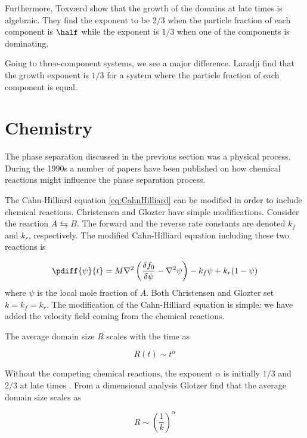 Furthermore, Toxv{\ae}rd \etal show that the growth of the domains at late
times is algebraic. They find the exponent to be $2/3$ when the
particle fraction of each component is $\half$ while the exponent is
$1/3$ when one of the components is dominating.

Going to three-component systems, we see a major difference. Laradji
\etal \cite{Laradji96} find that the growth exponent is $1/3$ for a
system where the particle fraction of each component is equal.


\section{Chemistry}
\label{sect:PhaseSepChem}
The phase separation discussed in the previous section was a physical
process. During the 1990s a number of papers have been published on
how chemical reactions might influence the phase separation process.

The Cahn-Hilliard equation \eqref{eq:CahnHilliard} can be modified in
order to include chemical reactions. Christensen \etal
\cite{Christensen96} and Glozter \etal \cite{Glotzer95} have simple
modifications. Consider the reaction $A \leftrightarrows B$. The
forward and the reverse rate constants are denoted $k_f$ and $k_r$,
respectively. The modified Cahn-Hilliard equation including these two
reactions is

\begin{equation}
  \pdiff{\psi}{t} = M\nabla^2 \left(\frac{\delta f_0}{\delta\psi} -
                    \nabla^2\psi\right) - k_f\psi + k_r (1-\psi)
\end{equation}
where $\psi$ is the local mole fraction of $A$. Both Christensen \etal
and Glozter \etal set $k = k_f = k_r$. The modification of the
Cahn-Hilliard equation is simple: we have added the velocity field coming
from the chemical reactions.

The average domain size $R$ scales with the time as

\begin{equation}
  R(t) \sim t^{\alpha}
\end{equation}

Without the competing chemical reactions, the exponent $\alpha$ is
initially $1/3$ and $2/3$ at late times \cite{Farrell91, Wu95}. From a
dimensional analysis Glotzer \etal \cite{Glotzer95} find that the
average domain size scales as 

\begin{equation}
  R \sim \left( \frac{1}{k} \right)^{\alpha}
\end{equation}

